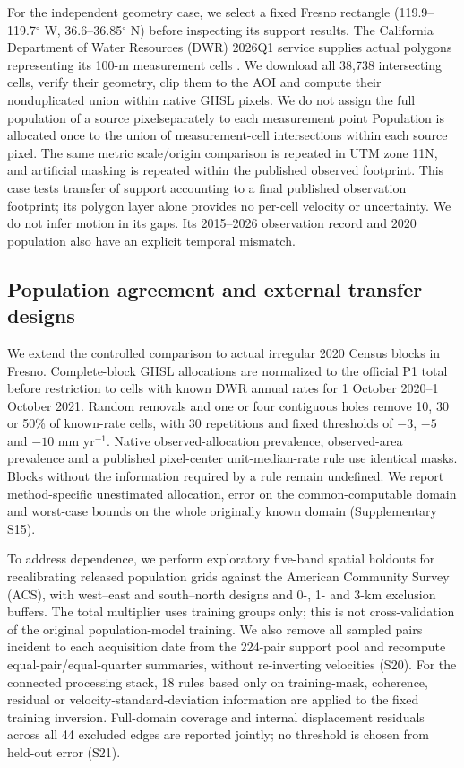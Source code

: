 \documentclass[pdflatex,sn-nature]{sn-jnl}
\providecommand{\DIFadd}[1]{{\protect\color{blue} \sf #1}} %
\providecommand{\DIFdel}[1]{{\protect\color{red} \scriptsize #1}} %
\providecommand{\DIFaddbegin}{} %
\providecommand{\DIFaddend}{} %
\providecommand{\DIFdelbegin}{} %
\providecommand{\DIFdelend}{} %
\begin{document}
For the independent geometry case, we select a fixed Fresno rectangle (119.9--119.7$^\circ$ W, 36.6--36.85$^\circ$ N) before inspecting its support results. The California Department of Water Resources (DWR) 2026Q1 service supplies actual polygons representing its 100-m measurement cells \citep{dwr2026,dwrdocumentation}. We download all 38,738 intersecting cells, verify their geometry, clip them to the AOI and compute their nonduplicated union within native GHSL pixels. \DIFdelbegin \DIFdel{We do not assign the full population of a source pixelseparately to each measurement point}\DIFdelend \DIFaddbegin \DIFadd{Population is allocated once to the union of measurement-cell intersections within each source pixel}\DIFaddend . The same metric scale/origin comparison is repeated in UTM zone 11N, and artificial masking is repeated within the published observed footprint. This case tests transfer of support accounting to a final published observation footprint; its polygon layer alone provides no per-cell velocity or uncertainty. We do not infer motion in its gaps. Its 2015--2026 observation record and 2020 population also have an explicit temporal mismatch.

\subsection{Population agreement and external transfer designs}
We extend the controlled comparison to actual irregular 2020 Census blocks in Fresno. Complete-block GHSL allocations are normalized to the official P1 total before restriction to cells with known DWR annual rates for 1 October 2020--1 October 2021. Random removals and one or four contiguous holes remove 10, 30 or 50\% of known-rate cells, with 30 repetitions and fixed thresholds of $-3$, $-5$ and $-10$ mm yr$^{-1}$. Native observed-allocation prevalence, observed-area prevalence and a published pixel-center unit-median-rate rule use identical masks. Blocks without the information required by a rule remain undefined. We report method-specific unestimated allocation, error on the common-computable domain and worst-case bounds on the whole originally known domain (Supplementary S15).

To address dependence, we perform exploratory five-band spatial holdouts for recalibrating released population grids against the American Community Survey (ACS), with west--east and south--north designs and 0-, 1- and 3-km exclusion buffers. The total multiplier uses training groups only; this is not cross-validation of the original population-model training. We also remove all sampled pairs incident to each acquisition date from the 224-pair support pool and recompute equal-pair/equal-quarter summaries, without re-inverting velocities (S20). For the connected processing stack, 18 rules based only on training-mask, coherence, residual or velocity-standard-deviation information are applied to the fixed training inversion. Full-domain coverage and internal displacement residuals across all 44 excluded edges are reported jointly; no threshold is chosen from held-out error (S21).
\end{document}
